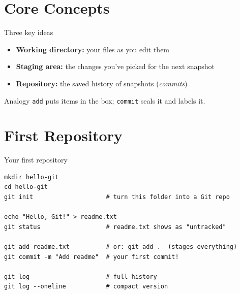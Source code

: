 \documentclass[aspectratio=169,11pt]{beamer}
\newcommand{\cmd}[1]{\texttt{\color{gitred}#1}}
\begin{document}
\section{Core Concepts}

\begin{frame}{Three key ideas}
  \begin{center}
  \end{center}

  \vspace{0.3em}
  \begin{itemize}
    \item \textbf{Working directory:} your files as you edit them
    \item \textbf{Staging area:} the changes you've picked for the next snapshot
    \item \textbf{Repository:} the saved history of snapshots (\emph{commits})
  \end{itemize}

  \begin{alertblock}{Analogy}
    \cmd{add} puts items in the box; \cmd{commit} seals it and labels it.
  \end{alertblock}
\end{frame}

\section{First Repository}

\begin{frame}[fragile]{Your first repository}
\begin{lstlisting}
mkdir hello-git
cd hello-git
git init                    # turn this folder into a Git repo

echo "Hello, Git!" > readme.txt
git status                  # readme.txt shows as "untracked"

git add readme.txt          # or: git add .  (stages everything)
git commit -m "Add readme"  # your first commit!

git log                     # full history
git log --oneline           # compact version
\end{lstlisting}
\end{frame}
\end{document}
